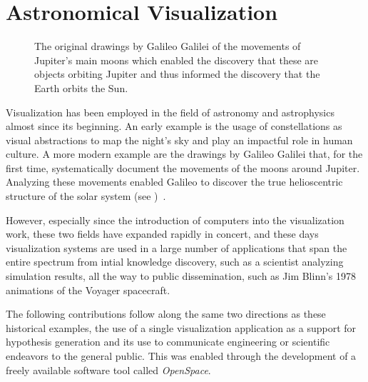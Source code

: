 \section{Astronomical Visualization} \label{contributions:astro}
\begin{figure}
\centering
{}
\caption{The original drawings by Galileo Galilei of the movements of Jupiter's main moons which enabled the discovery that these are objects orbiting Jupiter and thus informed the discovery that the Earth orbits the Sun.}
\label{contributions:astro:galileo}
\end{figure}

Visualization has been employed in the field of astronomy and astrophysics almost since its beginning.  An early example is the usage of constellations as visual abstractions to map the night's sky and play an impactful role in human culture.  A more modern example are the drawings by Galileo Galilei that, for the first time, systematically document the movements of the moons around Jupiter.  Analyzing these movements enabled Galileo to discover the true helioscentric structure of the solar system (see )~\cite{galilei1610sidereus}.

However, especially since the introduction of computers into the visualization work, these two fields have expanded rapidly in concert, and these days visualization systems are used in a large number of applications that span the entire spectrum from intial knowledge discovery, such as a scientist analyzing simulation results, all the way to public dissemination, such as Jim Blinn's 1978 animations of the Voyager spacecraft.

The following contributions follow along the same two directions as these historical examples, the use of a single visualization application as a support for hypothesis generation and its use to communicate engineering or scientific endeavors to the general public. This was enabled through the development of a freely available software tool called \emph{OpenSpace}.



